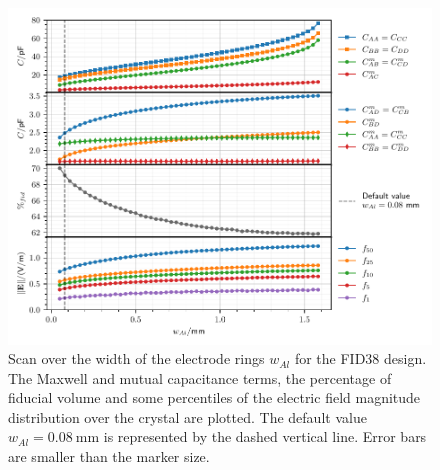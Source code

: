 \begin{figure}[!h]
\centering
\includegraphics[scale=1]{Figures/ElectrodesScan/capacitance_fiducial_al_width.pdf}
\caption{Scan over the width of the electrode rings $w_{Al}$ for the FID38 design. The Maxwell and mutual capacitance terms, the percentage of fiducial volume and some percentiles of the electric field magnitude distribution over the crystal are plotted. The default value $w_{Al}=\SI{0.08}{\mm}$ is represented by the dashed vertical line. Error bars are smaller than the marker size.}
\label{fig:capacitance-fiducial-al-width}
\end{figure}

